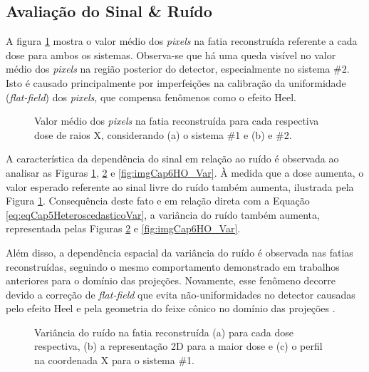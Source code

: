 \subsection{Avaliação do Sinal  \& Ruído}


A figura \ref{fig:imgCap6Means} mostra o valor médio dos \textit{pixels} na fatia reconstruída referente a cada dose para ambos os sistemas. Observa-se que há uma queda visível no valor médio dos \textit{pixels} na região posterior do detector, especialmente no sistema \#2. Isto é causado principalmente por imperfeições na calibração da uniformidade (\textit{flat-field}) dos \textit{pixels}, que compensa fenômenos como o efeito Heel.


\begin{figure}[!ht]
	\centering
	\caption{Valor médio dos \textit{pixels} na fatia reconstruída para cada respectiva dose de raios X, considerando (a) o sistema \#1 e (b) e \#2.}
	
	\label{fig:imgCap6Means}
\end{figure}

A característica da dependência do sinal em relação ao ruído é observada ao analisar as Figuras \ref{fig:imgCap6Means}, \ref{fig:imgCap6GE_Var} e \ref{fig:imgCap6HO_Var}. À medida que a dose aumenta, o valor esperado referente ao sinal livre do ruído também aumenta, ilustrada pela Figura \ref{fig:imgCap6Means}. Consequência deste fato e em relação direta com a Equação \ref{eq:eqCap5HeteroscedasticoVar}, a variância do ruído também aumenta, representada pelas Figuras \ref{fig:imgCap6GE_Var} e \ref{fig:imgCap6HO_Var}.

Além disso, a dependência espacial da variância do ruído é observada nas fatias reconstruídas, seguindo o mesmo comportamento demonstrado em trabalhos anteriores para o domínio das projeções. Novamente, esse fenômeno decorre devido a correção de \textit{flat-field} que evita não-uniformidades no detector causadas pelo efeito Heel e pela geometria do feixe cônico no domínio das projeções \cite{borges2017pipeline,borges2017method, borges2018restoration,brito2018application,guerrero2018}.

\begin{figure}[!ht]
	\centering
	\caption{Variância do ruído na fatia reconstruída (a) para cada dose respectiva, (b) a representação \acs{2D} para a maior dose e (c) o perfil na coordenada X para o sistema \#1.}

	\hfill
	\label{fig:imgCap6GE_Var}
\end{figure}

